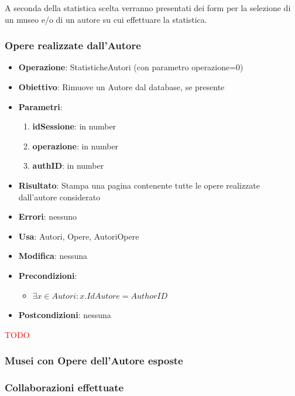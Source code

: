 \documentclass[a4paper,11pt]{article}
\begin{document}
A seconda della statistica scelta verranno presentati dei form per la selezione di un museo e/o di un autore su cui effettuare la statistica.

\subsubsection{Opere realizzate dall’Autore}
\begin{itemize}
	\item \textbf{Operazione}: StatisticheAutori (con parametro operazione=0)
	\item \textbf{Obiettivo}: Rimuove un Autore dal database, se presente
	\item \textbf{Parametri}:
	\begin{enumerate}
		\item \textbf{idSessione}: in number
		\item \textbf{operazione}: in number
		\item \textbf{authID}: in number
	\end{enumerate}
	\item \textbf{Risultato}: Stampa una pagina contenente tutte le opere realizzate dall'autore considerato
	\item \textbf{Errori}: nessuno
	\item \textbf{Usa}: Autori, Opere, AutoriOpere
	\item \textbf{Modifica}: nessuna
	\item \textbf{Precondizioni}:
	\begin{itemize}
		\item $\exists x \in Autori : x.IdAutore = AuthorID$
	\end{itemize}
	\item \textbf{Postcondizioni}: nessuna
\end{itemize}

\Huge \textcolor{red}{TODO}

\subsubsection{Musei con Opere dell’Autore esposte}
\subsubsection{Collaborazioni effettuate}
\end{document}
